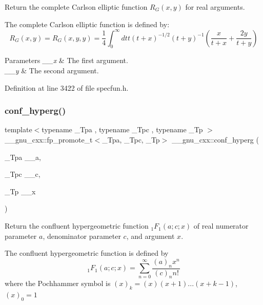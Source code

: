 Return the complete Carlson elliptic function $ R_G(x,y) $ for real arguments.

The complete Carlson elliptic function is defined by\+: \[ R_G(x,y) = R_G(x,y,y) = \frac{1}{4} \int_0^\infty dt t (t + x)^{-1/2}(t + y)^{-1} (\frac{x}{t + x} + \frac{2y}{t + y}) \]


\begin{DoxyParams}{Parameters}
{\em \+\_\+\+\_\+x} & The first argument. \\
\hline
{\em \+\_\+\+\_\+y} & The second argument. \\
\hline
\end{DoxyParams}


Definition at line 3422 of file specfun.\+h.

\mbox{\label{group__gnu__math__spec__func_ga4d01e85e7d295afca5d9f8b6c68f19cc}} 
\subsubsection{\texorpdfstring{conf\+\_\+hyperg()}{conf\_hyperg()}}
{\footnotesize\ttfamily template$<$typename \+\_\+\+Tpa , typename \+\_\+\+Tpc , typename \+\_\+\+Tp $>$ \\
\+\_\+\+\_\+gnu\+\_\+cxx\+::fp\+\_\+promote\+\_\+t$<$\+\_\+\+Tpa, \+\_\+\+Tpc, \+\_\+\+Tp$>$ \+\_\+\+\_\+gnu\+\_\+cxx\+::conf\+\_\+hyperg (\begin{DoxyParamCaption}\item[{\+\_\+\+Tpa}]{\+\_\+\+\_\+a,  }\item[{\+\_\+\+Tpc}]{\+\_\+\+\_\+c,  }\item[{\+\_\+\+Tp}]{\+\_\+\+\_\+x }\end{DoxyParamCaption})\hspace{0.3cm}{\ttfamily [inline]}}

Return the confluent hypergeometric function $ {}_1F_1(a;c;x) $ of real numerator parameter $ a $, denominator parameter $ c $, and argument $ x $.

The confluent hypergeometric function is defined by \[ {}_1F_1(a;c;x) = \sum_{n=0}^{\infty} \frac{(a)_n x^n}{(c)_n n!} \] where the Pochhammer symbol is $ (x)_k = (x)(x+1)...(x+k-1) $, $ (x)_0 = 1 $


